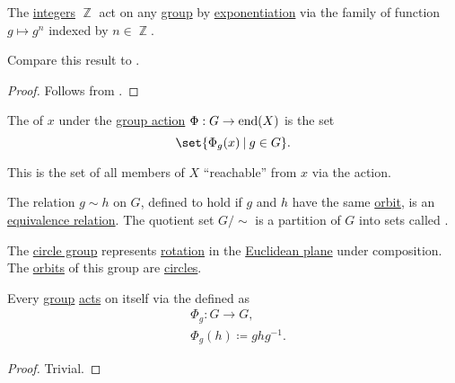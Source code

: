 \begin{proposition}\label{thm:exponentiation_group_action}
  The \hyperref[def:integers]{integers} \( \BbbZ \) act on any \hyperref[def:group]{group} by \hyperref[def:monoid/exponentiation]{exponentiation} via the family of function \( g \mapsto g^n \) indexed by \( n \in \BbbZ \).

  Compare this result to .
\end{proposition}
\begin{proof}
  Follows from .
\end{proof}

\begin{definition}\label{def:group_action_orbit}
  The  of \( x \) under the \hyperref[def:group_action]{group action} \( \Phi: G \to \operatorname{end}(X) \) is the set
  \begin{equation*}
    \set{ \Phi_g(x) \given g \in G }.
  \end{equation*}

  This is the set of all members of \( X \) \enquote{reachable} from \( x \) via the action.

  The relation \( g \sim h \) on \( G \), defined to hold if \( g \) and \( h \) have the same \hyperref[def:group_action_orbit]{orbit}, is an \hyperref[def:equivalence_relation]{equivalence relation}. The quotient set \( G / {\sim} \) is a partition of \( G \) into sets called .
\end{definition}

\begin{example}\label{ex:plane_rotation_action_orbits}
  The \hyperref[def:circle_group]{circle group} represents \hyperref[def:rigid_motion/rotation]{rotation} in the \hyperref[def:euclidean_plane]{Euclidean plane} under composition. The \hyperref[def:group_action_orbit]{orbits} of this group are \hyperref[def:circle]{circles}.
\end{example}

\begin{proposition}\label{thm:group_conjugation_action}
  Every \hyperref[def:group]{group} \hyperref[def:group_action]{acts} on itself via the  defined as
  \begin{equation*}
    \begin{aligned}
      &\Phi_g: G \to G, \\
      &\Phi_g(h) \coloneqq g h g^{-1}.
    \end{aligned}
  \end{equation*}
\end{proposition}
\begin{proof}
  Trivial.
\end{proof}

